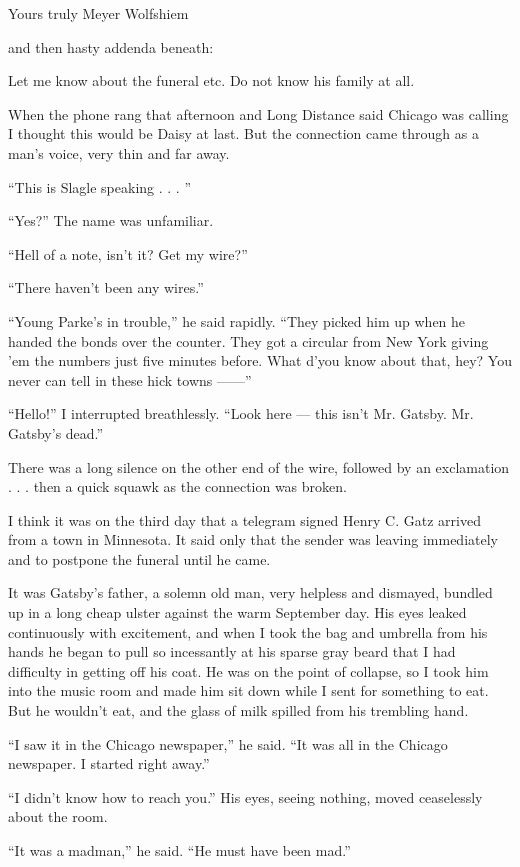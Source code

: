 \documentclass{znotebook}
\begin{document}
Yours truly Meyer Wolfshiem

and then hasty addenda beneath:

Let me know about the funeral etc. Do not know his family at all.

When the phone rang that afternoon and Long Distance said Chicago was calling I thought this would be Daisy at last. But the connection came through as a man's voice, very thin and far away.

``This is Slagle speaking . . . ''

``Yes?'' The name was unfamiliar.

``Hell of a note, isn't it? Get my wire?''

``There haven't been any wires.''

``Young Parke's in trouble,'' he said rapidly. ``They picked him up when he handed the bonds over the counter. They got a circular from New York giving 'em the numbers just five minutes before. What d'you know about that, hey? You never can tell in these hick towns ——''

``Hello!'' I interrupted breathlessly. ``Look here — this isn't Mr. Gatsby. Mr. Gatsby's dead.''

There was a long silence on the other end of the wire, followed by an exclamation . . . then a quick squawk as the connection was broken.

I think it was on the third day that a telegram signed Henry C. Gatz arrived from a town in Minnesota. It said only that the sender was leaving immediately and to postpone the funeral until he came.

It was Gatsby's father, a solemn old man, very helpless and dismayed, bundled up in a long cheap ulster against the warm September day. His eyes leaked continuously with excitement, and when I took the bag and umbrella from his hands he began to pull so incessantly at his sparse gray beard that I had difficulty in getting off his coat. He was on the point of collapse, so I took him into the music room and made him sit down while I sent for something to eat. But he wouldn't eat, and the glass of milk spilled from his trembling hand.

``I saw it in the Chicago newspaper,'' he said. ``It was all in the Chicago newspaper. I started right away.''

``I didn't know how to reach you.'' His eyes, seeing nothing, moved ceaselessly about the room.

``It was a madman,'' he said. ``He must have been mad.''
\end{document}
